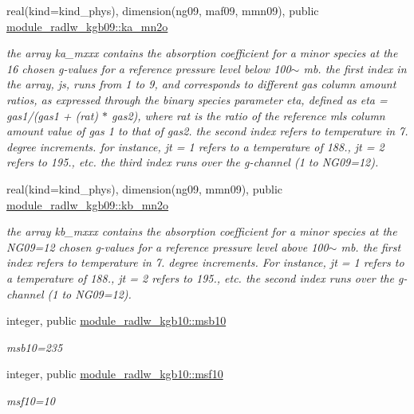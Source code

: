\begin{Indent}
\begin{DoxyCompactItemize}
real(kind=kind\+\_\+phys), dimension(ng09, maf09, mmn09), public \hyperlink{group__module__radlw__kgbnn_ga37d98e8066c5995060a2a8451b45705f}{module\+\_\+radlw\+\_\+kgb09\+::ka\+\_\+mn2o}
\begin{DoxyCompactList}\small\item\em the array ka\+\_\+mxxx contains the absorption coefficient for a minor species at the 16 chosen g-\/values for a reference pressure level below 100$\sim$ mb. the first index in the array, js, runs from 1 to 9, and corresponds to different gas column amount ratios, as expressed through the binary species parameter eta, defined as eta = gas1/(gas1 + (rat) $\ast$ gas2), where rat is the ratio of the reference mls column amount value of gas 1 to that of gas2. the second index refers to temperature in 7. degree increments. for instance, jt = 1 refers to a temperature of 188., jt = 2 refers to 195., etc. the third index runs over the g-\/channel (1 to N\+G09=12). \end{DoxyCompactList}\item 
real(kind=kind\+\_\+phys), dimension(ng09, mmn09), public \hyperlink{group__module__radlw__kgbnn_ga79326139db789012d47c4750917c2cdb}{module\+\_\+radlw\+\_\+kgb09\+::kb\+\_\+mn2o}
\begin{DoxyCompactList}\small\item\em the array kb\+\_\+mxxx contains the absorption coefficient for a minor species at the N\+G09=12 chosen g-\/values for a reference pressure level above 100$\sim$ mb. the first index refers to temperature in 7. degree increments. For instance, jt = 1 refers to a temperature of 188., jt = 2 refers to 195., etc. the second index runs over the g-\/channel (1 to N\+G09=12). \end{DoxyCompactList}\item 
integer, public \hyperlink{group__module__radlw__kgbnn_gaf33570d793ca152588c14ce30ac30798}{module\+\_\+radlw\+\_\+kgb10\+::msb10}
\begin{DoxyCompactList}\small\item\em msb10=235 \end{DoxyCompactList}\item 
integer, public \hyperlink{group__module__radlw__kgbnn_ga1b69c6fe99ed4ebc7b3d78b8f842b880}{module\+\_\+radlw\+\_\+kgb10\+::msf10}
\begin{DoxyCompactList}\small\item\em msf10=10 \end{DoxyCompactList}\item 

\end{DoxyCompactItemize}
\end{Indent}
